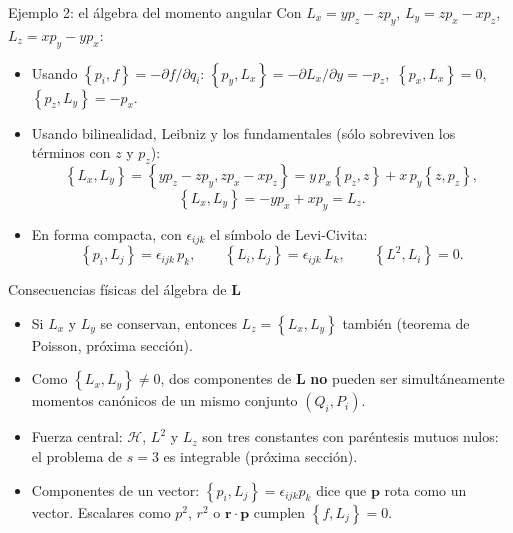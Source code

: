\documentclass[spanish]{beamer}
\newcommand{\Ham}{\mathcal{H}}
\newcommand{\pb}[2]{\left\{#1,#2\right\}}   %
\begin{document}
\begin{frame}{Ejemplo 2: el álgebra del momento angular}
Con $L_x = yp_z - zp_y$, $L_y = zp_x - xp_z$, $L_z = xp_y - yp_x$:
\begin{itemize}
  \item<2-> Usando $\pb{p_i}{f} = -\partial f/\partial q_i$:
  \(
    \pb{p_y}{L_x} = -\partial L_x/\partial y = -p_z,
  \)
  \(
    \pb{p_x}{L_x} = 0,
  \)
  \(
    \pb{p_z}{L_y} = -p_x .
  \)
  \item<3-> Usando bilinealidad, Leibniz y los fundamentales (sólo sobreviven los
        términos con $z$ y $p_z$):
  \[
    \pb{L_x}{L_y} = \pb{yp_z - zp_y}{zp_x - xp_z}
                  = y\,p_x\pb{p_z}{z} + x\,p_y\pb{z}{p_z},
  \]
  \[
    \pb{L_x}{L_y} = -yp_x + xp_y = L_z .
  \]
  \item<4-> En forma compacta, con $\epsilon_{ijk}$ el símbolo de Levi-Civita:
  \[
    \pb{p_i}{L_j} = \epsilon_{ijk}\,p_k, \qquad
    \pb{L_i}{L_j} = \epsilon_{ijk}\,L_k, \qquad
    \pb{L^2}{L_i} = 0 .
  \]
\end{itemize}
\end{frame}

\begin{frame}{Consecuencias físicas del álgebra de $\mathbf L$}
\begin{itemize}
  \item<1-> Si $L_x$ y $L_y$ se conservan, entonces $L_z = \pb{L_x}{L_y}$ también
        (teorema de Poisson, próxima sección).
  \item<2-> Como $\pb{L_x}{L_y}\neq 0$, dos componentes de $\mathbf L$ \textbf{no}
        pueden ser simultáneamente momentos canónicos de un mismo conjunto
        $(Q_i,P_i)$.
  \item<3-> Fuerza central: $\Ham$, $L^2$ y $L_z$ son tres constantes con paréntesis
        mutuos nulos: el problema de $s=3$ es integrable (próxima sección).
  \item<4-> Componentes de un vector: $\pb{p_i}{L_j} = \epsilon_{ijk}p_k$ dice que
        $\mathbf p$ rota como un vector. Escalares como $p^2$, $r^2$ o
        $\mathbf r\cdot\mathbf p$ cumplen $\pb{f}{L_j} = 0$.
\end{itemize}
\end{frame}
\end{document}
